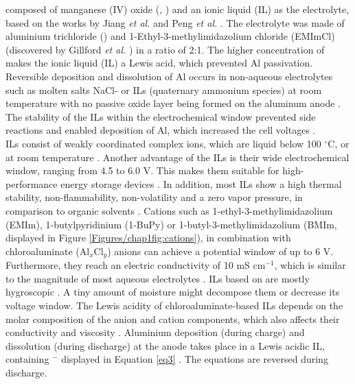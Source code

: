 composed of manganese (IV) oxide (, ) and an ionic liquid (IL) as the electrolyte, based on the works by Jiang \textit{et al.} and Peng \textit{et al.} \cite{paranthaman_transformational_2010, jiang_electrodeposition_2006, peng_investigation_2008}. 
The electrolyte was made of aluminium trichloride () and 1-Ethyl-3-methylimidazolium chloride (EMImCl) (discovered by Gillford \textit{et al.} \cite{gifford_aluminum/chlorine_1988}) in a ratio of 2:1. The higher concentration of  makes the ionic liquid (IL) a Lewis acid, which prevented Al passivation. 
Reversible deposition and dissolution of Al occurs in non-aqueous electrolytes such as molten salts NaCl- or ILs (quaternary ammonium species) at room temperature with no passive oxide layer being formed on the aluminum anode \cite{vestergaard_molten_1993, galinski_ionic_2006, elia_insights_2017}. The stability of the ILs within the electrochemical window prevented side reactions and enabled deposition of Al, which increased the cell voltages \cite{li_aluminum_2002}.\\ ILs consist of weakly coordinated complex ions, which are liquid below 100 $^{\circ}$C, or at room temperature \cite{hayes_structure_2015}. Another advantage of the ILs is their wide electrochemical window, ranging from 4.5 to 6.0 V. This makes them suitable for high-performance energy storage devices \cite{wang_binder-free_2015}. In addition, most ILs show a high thermal stability, non-flammability, non-volatility and a zero vapor pressure, in comparison to organic solvents \cite{dieter_ionic_1988}. Cations such as 1-ethyl-3-methylimidazolium (EMIm), 1-butylpyridinium (1-BuPy) or 1-butyl-3-methylimidazolium (BMIm, displayed in Figure \ref{Figures/chap1fig:cations}), in combination with chloroaluminate (Al$_x$Cl$_y$) anions can achieve a potential window of up to 6 V. Furthermore, they reach an electric conductivity of 10 mS cm$^{-1}$, which is similar to the magnitude of most aqueous electrolytes \cite{ngo_thermal_2000}. ILs based on  are mostly hygroscopic \cite{ueda_electroplating_2012}. A tiny amount of moisture might decompose them or decrease its voltage window. The Lewis acidity of chloroaluminate-based ILs depends on the molar composition of the anion and cation components, which also affects their conductivity and viscosity \cite{buzzeo_non-haloaluminate_2004}. Aluminium deposition (during charge) and dissolution (during discharge) at the anode takes place in a Lewis acidic IL, containing $^-$ displayed in Equation \ref{eq3} \cite{galinski_ionic_2006}. The equations are reversed during discharge.\\

